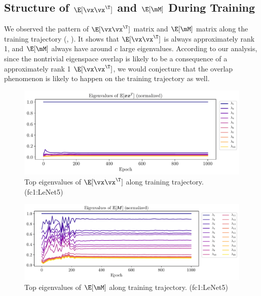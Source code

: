 \subsection{Structure of \texorpdfstring{$\E[\vx\vx^\T]$}{ExxT} and \texorpdfstring{$\E[\mM]$}{EM} During Training}
\label{sec:appendix_training_traj}
We observed the pattern of $\E[\vx\vx^\T]$ matrix and $\E[\mM]$ matrix along the training trajectory (, ). It shows that $\E[\vx\vx^\T]$ is always approximately rank 1, and $\E[\mM]$ always have around $c$ large eigenvalues. According to our analysis, since the nontrivial eigenspace overlap is likely to be a consequence of a approximately rank 1 $\E[\vx\vx^\T]$, we would conjecture that the overlap phenomenon is likely to happen on the training trajectory as well.

\begin{figure}[H]
    \centering
    \includegraphics[height=0.2\textheight]{Appendix_Figures/Along_traj/ExxT_val/ExxT_trend_10_CIFAR10_Exp1_LeNet5_fixlr0.01R1_0_1000_fc1.pdf}
    \caption{Top eigenvalues of $\E[\vx\vx^\T]$ along training trajectory. (fc1:LeNet5)}
    \label{fig:traj_xxT_lenet5_fc1}
\end{figure}

\begin{figure}[H]
    \centering
    \includegraphics[height=0.2\textheight]{Appendix_Figures/Along_traj/UTAU_val/EUTAU_trend_20_CIFAR10_Exp1_LeNet5_fixlr0.01R1_0_1000_fc1.pdf}
    \caption{Top eigenvalues of $\E[\mM]$ along training trajectory. (fc1:LeNet5)}
    \label{fig:traj_UTAU_lenet5_fc1}
\end{figure}